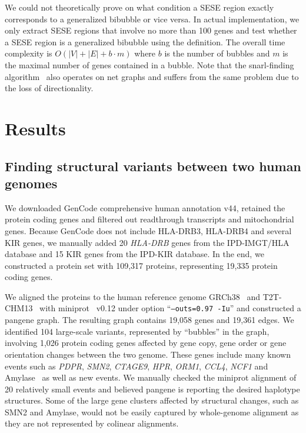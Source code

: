 \documentclass[webpdf,contemporary,large,namedate]{oup-authoring-template}%
\begin{document}
We could not theoretically prove on what condition a SESE region exactly corresponds to a generalized bibubble or vice versa.
In actual implementation, we only extract SESE regions that involve no more than 100 genes
and test whether a SESE region is a generalized bibubble using the definition.
The overall time complexity is $O(|V|+|E|+b\cdot m)$ where $b$ is the number of bubbles and $m$ is the maximal number of genes contained in a bubble.
Note that the snarl-finding algorithm~\citep{Paten:2018aa} also operates on net graphs and suffers from the same problem due to the loss of directionality.

\section{Results}

\subsection{Finding structural variants between two human genomes}

We downloaded GenCode comprehensive human annotation v44,
retained the protein coding genes and filtered out readthrough transcripts and mitochondrial genes.
Because GenCode does not include HLA-DRB3, HLA-DRB4 and several KIR genes,
we manually added 20 {\it HLA-DRB} genes from the IPD-IMGT/HLA database and
15 KIR genes from the IPD-KIR database.
In the end, we constructed a protein set with 109,317 proteins, representing 19,335 protein coding genes.

We aligned the proteins to the human reference genome GRCh38~\citep{Schneider:2017aa} and T2T-CHM13~\citep{Nurk:2022up}
with miniprot~\citep{Li:2023ac} v0.12 under option ``{\tt --outs=0.97 -Iu}''
and constructed a pangene graph.
The resulting graph contains 19,058 genes and 19,361 edges.
We identified 104 large-scale variants, represented by ``bubbles'' in the graph,
involving 1,026 protein coding genes affected by gene copy, gene order or gene orientation changes between the two genome.
These genes include many known events such as {\it PDPR}, {\it SMN2}, {\it CTAGE9}, {\it HPR}, {\it ORM1}, {\it CCL4}, {\it NCF1} and Amylase~\citep{Handsaker:2015ur,Sudmant:2010aa}
as well as new events.
We manually checked the miniprot alignment of 20 relatively small events
and believed pangene is reporting the desired haplotype structures.
Some of the large gene clusters affected by structural changes, such as SMN2 and Amylase,
would not be easily captured by whole-genome alignment as they are not represented by colinear alignments.
\end{document}
